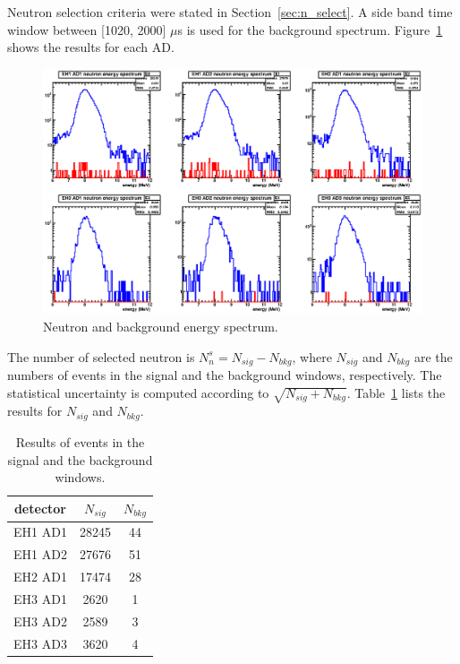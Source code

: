 Neutron selection criteria were stated in Section~\ref{sec:n_select}. A side band time window between [1020, 2000] $\mu$s is used for the background spectrum. Figure~\ref{fig:energy_spectrum} shows the results for each AD.
\begin{figure}[ht]
	\centering
	\includegraphics[width=\textwidth]{figures/chap7/neutron_energy_spectrum.eps}
	\caption{Neutron and background energy spectrum.}
	\label{fig:energy_spectrum}
\end{figure}
The number of selected neutron is $N_n^s=N_{sig}-N_{bkg}$, where $N_{sig}$ and $N_{bkg}$ are the numbers of events in the signal and the background windows, respectively. The statistical uncertainty is computed according to $\sqrt{N_{sig}+N_{bkg}}$. Table~\ref{tab:number_of_neutrons} lists the results for $N_{sig}$ and $N_{bkg}$.
\begin{table}[ht]
	\centering
	\begin{tabular}{|c|c|c|}
		\hline
		detector & $N_{sig}$ & $N_{bkg}$ \\
		\hline
		EH1 AD1 & 28245 & 44 \\
		\hline
		EH1 AD2 & 27676 & 51 \\
		\hline
		EH2 AD1 & 17474 & 28 \\
		\hline
		EH3 AD1 & 2620 & 1 \\
		\hline
		EH3 AD2 & 2589 & 3 \\
		\hline
		EH3 AD3 & 3620 & 4 \\
		\hline
	\end{tabular}
	\caption{Results of events in the signal and the background windows.}
	\label{tab:number_of_neutrons}
\end{table}

